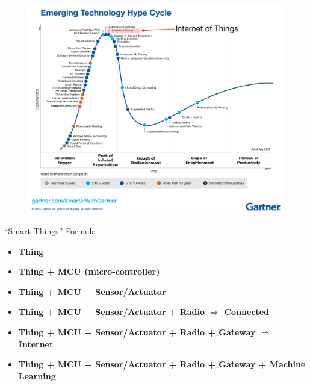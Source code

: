 \begin{frame}
  \begin{figure}
    \includegraphics[width=\textwidth]{figures/hype.png}
  \end{figure}
\end{frame}

\begin{frame}{``Smart Things'' Formula}

  \begin{itemize}
  \item<1-> \textbf<1>{Thing}
  \item<2-> \textbf<2>{Thing + MCU (micro-controller)}
  \item<3-> \textbf<3>{Thing + MCU + Sensor/Actuator}
  \item<4-> \textbf<4>{Thing + MCU + Sensor/Actuator + Radio $\Rightarrow$ Connected}
  \item<5-> \textbf<5>{Thing + MCU + Sensor/Actuator + Radio + Gateway $\Rightarrow$ Internet}
  \item<5-> \textbf<6>{Thing + MCU + Sensor/Actuator + Radio + Gateway + Machine
    Learning}
  \end{itemize}

\end{frame}


